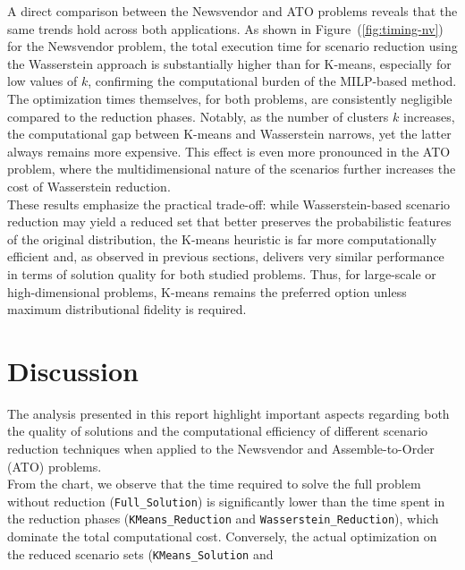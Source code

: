 \documentclass[a4paper,12pt]{article}
\begin{document}
	\noindent
	A direct comparison between the Newsvendor and ATO problems reveals that the same trends hold across both applications. As shown in Figure~(\ref{fig:timing-nv}) for the Newsvendor problem, the total execution time for scenario reduction using the Wasserstein approach is substantially higher than for K-means, especially for low values of $k$, confirming the computational burden of the MILP-based method. The optimization times themselves, for both problems, are consistently negligible compared to the reduction phases.	Notably, as the number of clusters $k$ increases, the computational gap between K-means and Wasserstein narrows, yet the latter always remains more expensive. This effect is even more pronounced in the ATO problem, where the multidimensional nature of the scenarios further increases the cost of Wasserstein reduction. \\
	
	\noindent These results emphasize the practical trade-off: while Wasserstein-based scenario reduction may yield a reduced set that better preserves the probabilistic features of the original distribution, the K-means heuristic is far more computationally efficient and, as observed in previous sections, delivers very similar performance in terms of solution quality for both studied problems. Thus, for large-scale or high-dimensional problems, K-means remains the preferred option unless maximum distributional fidelity is required.
	
	
	\newpage
	
	\section{Discussion}
	
	\noindent The analysis presented in this report highlight important aspects regarding both the quality of solutions and the computational efficiency of different scenario reduction techniques when applied to the Newsvendor and Assemble-to-Order (ATO) problems.\\
	
	\noindent From the chart, we observe that the time required to solve the full problem without reduction (\texttt{Full\_Solution}) is significantly lower than the time spent in the reduction phases (\texttt{KMeans\_Reduction} and \texttt{Wasserstein\_Reduction}), which dominate the total computational cost. Conversely, the actual optimization on the reduced scenario sets (\texttt{KMeans\_Solution} and 
	
\end{document}
